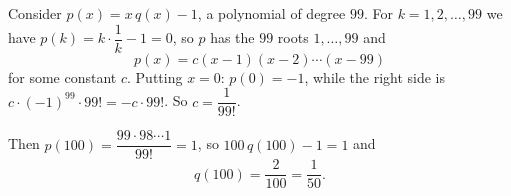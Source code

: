 Consider $p(x)=x\,q(x)-1$, a polynomial of degree $99$. For $k=1,2,\ldots,99$ we have $p(k)=k\cdot\dfrac{1}{k}-1=0$, so $p$ has the $99$ roots $1,\ldots,99$ and
\[p(x)=c(x-1)(x-2)\cdots(x-99)\]
for some constant $c$. Putting $x=0$: $p(0)=-1$, while the right side is $c\cdot(-1)^{99}\cdot99!=-c\cdot99!$. So $c=\dfrac{1}{99!}$.

Then $p(100)=\dfrac{99\cdot98\cdots1}{99!}=1$, so $100\,q(100)-1=1$ and
\[q(100)=\dfrac{2}{100}=\boxed{\dfrac{1}{50}}.\]
